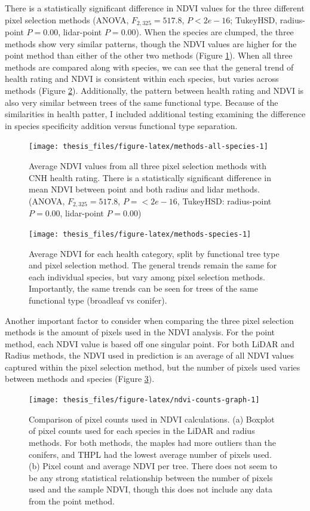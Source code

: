 \documentclass[12pt,twoside]{reedthesis}
\begin{document}
There is a statistically significant difference in NDVI values for the three different pixel selection methods (ANOVA, \(F_{2, 325}=517.8\), \(P < 2e-16\); TukeyHSD, radius-point \(P = 0.00\), lidar-point \(P = 0.00\)). When the species are clumped, the three methods show very similar patterns, though the NDVI values are higher for the point method than either of the other two methods (Figure \ref{fig:methods-all-species}). When all three methods are compared along with species, we can see that the general trend of health rating and NDVI is consistent within each species, but varies across methods (Figure \ref{fig:methods-species}). Additionally, the pattern between health rating and NDVI is also very similar between trees of the same functional type. Because of the similarities in health patter, I included additional testing examining the difference in species specificity addition versus functional type separation.
\begin{figure}
\texttt{[image: thesis\_files/figure-latex/methods-all-species-1]} \caption[NDVI and health rating comparison across methods]{Average NDVI values from all three pixel selection methods with CNH health rating. There is a statistically significant difference in mean NDVI between point and both radius and lidar methods. (ANOVA, $F_{2, 325}=517.8$, $P = <2e-16$, TukeyHSD: radius-point $P = 0.00$, lidar-point $P = 0.00$)}\label{fig:methods-all-species}
\end{figure}
\begin{figure}
\texttt{[image: thesis\_files/figure-latex/methods-species-1]} \caption[Average NDVI comparison between species and methods.]{Average NDVI for each health category, split by functional tree type and pixel selection method. The general trends remain the same for each individual species, but vary among pixel selection methods. Importantly, the same trends can be seen for trees of the same functional type (broadleaf vs conifer). }\label{fig:methods-species}
\end{figure}
Another important factor to consider when comparing the three pixel selection methods is the amount of pixels used in the NDVI analysis. For the point method, each NDVI value is based off one singular point. For both LiDAR and Radius methods, the NDVI used in prediction is an average of all NDVI values captured within the pixel selection method, but the number of pixels used varies between methods and species (Figure \ref{fig:ndvi-counts-graph}).
\begin{figure}
\texttt{[image: thesis\_files/figure-latex/ndvi-counts-graph-1]} \caption[Pixel counts for NDVI calculation, by method, and for sample NDVI.]{Comparison of pixel counts used in NDVI calculations. (a) Boxplot of pixel counts used for each species in the LiDAR and radius methods. For both methods, the maples had more outliers than the conifers, and THPL had the lowest average number of pixels used. (b) Pixel count and average NDVI per tree. There does not seem to be any strong statistical relationship between the number of pixels used and the sample NDVI, though this does not include any data from the point method.}\label{fig:ndvi-counts-graph}
\end{figure}
\end{document}
